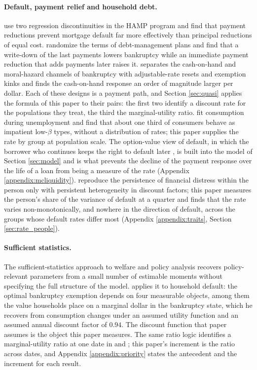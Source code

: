 \paragraph{Default, payment relief and household debt.} \citet{ganong_liquidity_2020} use two regression discontinuities in the HAMP program and find that payment reductions prevent mortgage default far more effectively than principal reductions of equal cost. \citet{dobbie_targeted_2020} randomize the terms of debt-management plans and find that a write-down of the last payments lowers bankruptcy while an immediate payment reduction that adds payments later raises it. \citet{indarte_moral_2023} separates the cash-on-hand and moral-hazard channels of bankruptcy with adjustable-rate resets and exemption kinks and finds the cash-on-hand response an order of magnitude larger per dollar. Each of these designs is a payment path, and Section \ref{sec:quasi} applies the formula of this paper to their pairs: the first two identify a discount rate for the populations they treat, the third the marginal-utility ratio. \citet{ganong_consumer_2019} fit consumption during unemployment and find that about one third of consumers behave as impatient low-$\beta$ types, without a distribution of rates; this paper supplies the rate by group at population scale. The option-value view of default, in which the borrower who continues keeps the right to default later \citep{deng_mortgage_2000, campbell_model_2015}, is built into the model of Section \ref{sec:model} and is what prevents the decline of the payment response over the life of a loan from being a measure of the rate (Appendix \ref{appendix:mcliquidity}). \citet{athreya_persistence_2019} reproduce the persistence of financial distress within the person only with persistent heterogeneity in discount factors; this paper measures the person's share of the variance of default at a quarter and finds that the rate varies non-monotonically, and nowhere in the direction of default, across the groups whose default rates differ most (Appendix \ref{appendix:traits}, Section \ref{sec:rate_people}).

\paragraph{Sufficient statistics.} The sufficient-statistics approach to welfare and policy analysis \citep{chetty_sufficient_2009} recovers policy-relevant parameters from a small number of estimable moments without specifying the full structure of the model. \citet{davila_exemptions_2020} applies it to household default: the optimal bankruptcy exemption depends on four measurable objects, among them the value households place on a marginal dollar in the bankruptcy state, which he recovers from consumption changes under an assumed utility function and an assumed annual discount factor of $0.94$. The discount function that paper assumes is the object this paper measures. The same ratio logic identifies a marginal-utility ratio at one date in \citet{chetty_moral_2008} and \citet{indarte_moral_2023}; this paper's increment is the ratio across dates, and Appendix \ref{appendix:priority} states the antecedent and the increment for each result.

